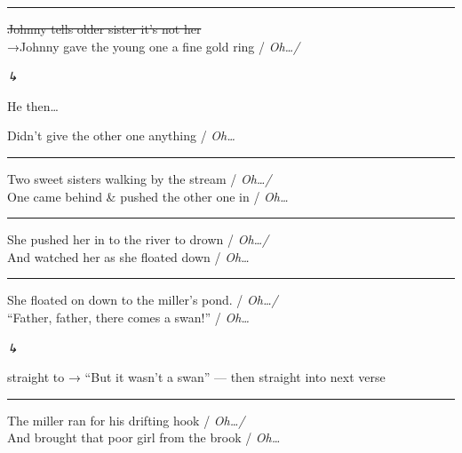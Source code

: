 \documentclass[11pt, a4paper]{article}
\newcommand{\cutline}[1]{%
  {\color{strikegray}\sout{#1}%
  \enspace{\ttfamily\scriptsize[X]}}%
}
\newenvironment{annotation}{%
  \par\noindent\hspace{1em}%
  \begin{minipage}[t]{0.82\linewidth}%
  \ttfamily\footnotesize\color{annotred}\itshape
  {\symbolfont ↳}\enspace\ignorespaces
}{%
  \end{minipage}\par\smallskip%
}
\newenvironment{songverse}{%
  \vspace{0.5em}\noindent%
}{%
  \vspace{0.5em}\par%
}
\begin{document}
\medskip\hrule\medskip

\begin{songverse}
\begin{bracketgroup}
\cutline{Johnny tells older sister it's not her}\\[3pt]
{\symbolfont →}\enspace Johnny gave the young one a fine gold ring / \textit{Oh\ldots /}
\begin{annotation}
He then\ldots
\end{annotation}
Didn't give the other one anything / \textit{Oh\ldots}
\end{bracketgroup}
\end{songverse}

\medskip\hrule\medskip

\begin{songverse}
\begin{bracketgroup}
Two sweet sisters walking by the stream / \textit{Oh\ldots /}\\
One came behind \& pushed the other one in / \textit{Oh\ldots}
\end{bracketgroup}
\end{songverse}

\medskip\hrule\medskip

\begin{songverse}
\begin{bracketgroup}
She pushed her in to the river to drown / \textit{Oh\ldots /}\\
And watched her as she floated down / \textit{Oh\ldots}
\end{bracketgroup}
\end{songverse}

\medskip\hrule\medskip

\begin{songverse}
\begin{bracketgroup}
She floated on down to the miller's pond. / \textit{Oh\ldots /}\\
``Father, father, there comes a swan!'' / \textit{Oh\ldots}
\begin{annotation}
straight to {\symbolfont →} ``But it wasn't a swan'' --- then straight into next verse
\end{annotation}
\end{bracketgroup}
\end{songverse}

\medskip\hrule\medskip

\begin{songverse}
\begin{bracketgroup}
The miller ran for his drifting hook / \textit{Oh\ldots /}\\
And brought that poor girl from the brook / \textit{Oh\ldots}
\end{bracketgroup}
\end{songverse}
\end{document}
